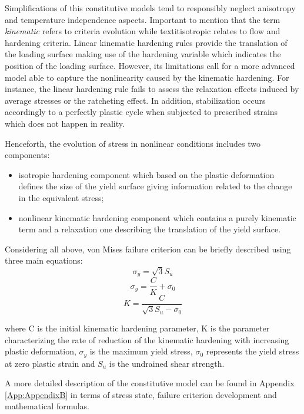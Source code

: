 \documentclass[12pt,a4paper]{report}
\begin{document}
Simplifications of this constitutive models tend to responsibly neglect anisotropy and \mbox{temperature} independence aspects. Important to mention that the term \textit{kinematic} refers to criteria evolution while textit{isotropic} relates to flow and hardening criteria. Linear kinematic hardening rules provide the translation of the loading surface making use of the hardening variable which indicates the position of the loading surface. However, its limitations call for a more advanced model able to capture the nonlinearity caused by the kinematic hardening. For instance, the linear hardening rule fails to assess the relaxation effects induced by average stresses or the ratcheting effect. In addition, stabilization occurs accordingly to a perfectly plastic cycle when subjected to prescribed strains which does not happen in reality.

Henceforth, the evolution of stress in nonlinear conditions includes two components:

\begin{itemize}
	\item 	isotropic hardening component which based on the plastic deformation defines the size of the yield surface giving information related to the change in the equivalent stress;
	\item 	nonlinear kinematic hardening component which contains a purely kinematic term and a relaxation one describing the translation of the yield surface.
	\end{itemize}
	
	
Considering all above, von Mises failure criterion can be briefly described using three main equations:
\begin{equation}
\sigma_y = \sqrt{3}S_u
\end{equation}
\begin{equation}
\sigma_y = \frac{C}{K}+\sigma_0
\end{equation}
\begin{equation}
K=\frac{C}{\sqrt{3}S_u-\sigma_0}
\end{equation}

where C is the initial kinematic hardening parameter, K is the parameter characterizing the rate of reduction of the kinematic hardening with increasing plastic deformation, $\sigma_y$ is the maximum yield stress, $\sigma_0$ represents the yield stress at zero plastic strain and $S_u$ is the undrained shear strength. 

A more detailed description of the constitutive model can be found in Appendix \ref{App:AppendixB} in terms of stress state, failure criterion development and mathematical formulas.
\end{document}
